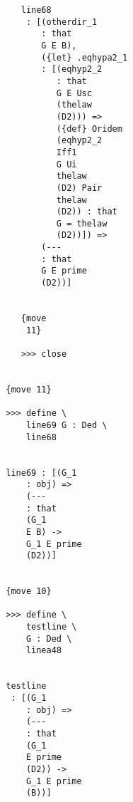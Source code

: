 \documentclass[12pt]{article}
\begin{document}
\begin{verbatim}
                                    line68 
                                     : [(otherdir_1 
                                        : that 
                                        G E B), 
                                        ({let} .eqhypa2_1 
                                        : [(eqhyp2_2 
                                           : that 
                                           G E Usc 
                                           (thelaw 
                                           (D2))) => 
                                           ({def} Oridem 
                                           (eqhyp2_2 
                                           Iff1 
                                           G Ui 
                                           thelaw 
                                           (D2) Pair 
                                           thelaw 
                                           (D2)) : that 
                                           G = thelaw 
                                           (D2))]) => 
                                        (--- 
                                        : that 
                                        G E prime 
                                        (D2))]


                                    {move 
                                     11}

                                    >>> close


                                 {move 11}

                                 >>> define \
                                     line69 G : Ded \
                                     line68


                                 line69 : [(G_1 
                                     : obj) => 
                                     (--- 
                                     : that 
                                     (G_1 
                                     E B) -> 
                                     G_1 E prime 
                                     (D2))]


                                 {move 10}

                                 >>> define \
                                     testline \
                                     G : Ded \
                                     linea48


                                 testline 
                                  : [(G_1 
                                     : obj) => 
                                     (--- 
                                     : that 
                                     (G_1 
                                     E prime 
                                     (D2)) -> 
                                     G_1 E prime 
                                     (B))]



\end{verbatim}
\end{document}
